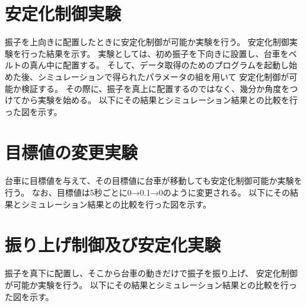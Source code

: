 \section{安定化制御実験}
	振子を上向きに配置したときに安定化制御が可能か実験を行う。
	安定化制御実験を行った結果を示す。
	実験としては、初め振子を下向きに設置し、台車をベルトの真ん中に配置する。
	そして、データ取得のためのプログラムを起動し始めた後、シミュレーションで得られたパラメータの組を用いて
	安定化制御が可能か検証する。
	その際に、振子を真上に配置するのではなく、幾分か角度をつけてから実験を始める。
	以下にその結果とシミュレーション結果との比較を行った図を示す。
\section{目標値の変更実験}
	台車に目標値を与えて、その目標値に台車が移動しても安定化制御可能か実験を行う。
	なお、目標値は5秒ごとに0→0.1→0のように変更される。
	以下にその結果とシミュレーション結果との比較を行った図を示す。

\section{振り上げ制御及び安定化実験}
	振子を真下に配置し、そこから台車の動きだけで振子を振り上げ、
	安定化制御が可能か実験を行う。
	以下にその結果とシミュレーション結果との比較を行った図を示す。

